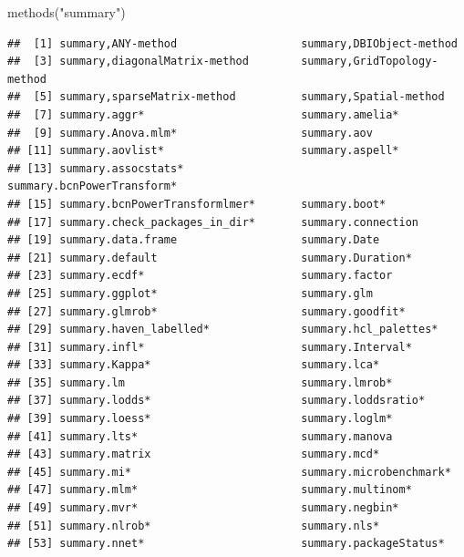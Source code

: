 \documentclass[
]{book}
\newenvironment{Shaded}{\begin{snugshade}}{\end{snugshade}}
\newcommand{\FunctionTok}[1]{\textcolor[rgb]{0.00,0.00,0.00}{#1}}
\newcommand{\NormalTok}[1]{#1}
\newcommand{\StringTok}[1]{\textcolor[rgb]{0.31,0.60,0.02}{#1}}
\theoremstyle{definition}
\theoremstyle{definition}
\theoremstyle{definition}
\theoremstyle{definition}
\theoremstyle{remark}
\begin{document}
\begin{Shaded}
\begin{Highlighting}[]
\FunctionTok{methods}\NormalTok{(}\StringTok{"summary"}\NormalTok{)}
\end{Highlighting}
\end{Shaded}

\begin{verbatim}
##  [1] summary,ANY-method                   summary,DBIObject-method            
##  [3] summary,diagonalMatrix-method        summary,GridTopology-method         
##  [5] summary,sparseMatrix-method          summary,Spatial-method              
##  [7] summary.aggr*                        summary.amelia*                     
##  [9] summary.Anova.mlm*                   summary.aov                         
## [11] summary.aovlist*                     summary.aspell*                     
## [13] summary.assocstats*                  summary.bcnPowerTransform*          
## [15] summary.bcnPowerTransformlmer*       summary.boot*                       
## [17] summary.check_packages_in_dir*       summary.connection                  
## [19] summary.data.frame                   summary.Date                        
## [21] summary.default                      summary.Duration*                   
## [23] summary.ecdf*                        summary.factor                      
## [25] summary.ggplot*                      summary.glm                         
## [27] summary.glmrob*                      summary.goodfit*                    
## [29] summary.haven_labelled*              summary.hcl_palettes*               
## [31] summary.infl*                        summary.Interval*                   
## [33] summary.Kappa*                       summary.lca*                        
## [35] summary.lm                           summary.lmrob*                      
## [37] summary.lodds*                       summary.loddsratio*                 
## [39] summary.loess*                       summary.loglm*                      
## [41] summary.lts*                         summary.manova                      
## [43] summary.matrix                       summary.mcd*                        
## [45] summary.mi*                          summary.microbenchmark*             
## [47] summary.mlm*                         summary.multinom*                   
## [49] summary.mvr*                         summary.negbin*                     
## [51] summary.nlrob*                       summary.nls*                        
## [53] summary.nnet*                        summary.packageStatus*              

\end{verbatim}
\end{document}
